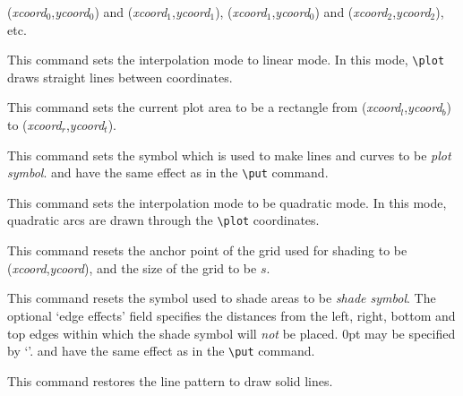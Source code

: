 \begin{syntax}
(\emph{xcoord}$_0$,\emph{ycoord}$_0$) and (\emph{xcoord}$_1$,\emph{ycoord}$_1$), (\emph{xcoord}$_1$,\emph{ycoord}$_0$)
and (\emph{xcoord}$_2$,\emph{ycoord}$_2$), etc.
\item[\tt\bsl setlinear]
This command sets the interpolation mode to linear mode. In this mode,
\verb+\plot+ draws straight lines between coordinates.
\item[\tt\bsl setplotarea x from \emph{xcoord}$_l$ to \emph{xcoord}$_r$, y from \emph{ycoord}$_b$
to \emph{ycoord}$_t$]
\begin{sloppypar}
This command sets the current plot area to be a rectangle from
(\emph{xcoord}$_l$,\emph{ycoord}$_b$) to (\emph{xcoord}$_r$,\emph{ycoord}$_t$).
\end{sloppypar}
\item[{\tt\bsl setplotsymbol (\{\emph{plot symbol}\}
{\rm[}[{\rm[}$o_x${\rm]}{\rm[}$o_y${\rm]}]{\rm]}
{\rm[}<\emph{xshift},\emph{yshift}>{\rm]})}]
This command sets the symbol which is used to make lines and curves to be
\emph{plot symbol}.
 and \type{[{\rm[}$o_x${\rm]}{\rm[}$o_y${\rm]}]}
have the same effect as in the \verb+\put+ command.
\item[\tt\bsl setquadratic]
This command sets the interpolation mode to be quadratic mode. In this mode,
quadratic arcs are drawn through the \verb+\plot+ coordinates.
\item[{\tt\bsl setshadegrid {\rm[}span <$s$>{\rm]} {\rm[}point at \emph{xcoord}
\emph{ycoord}{\rm]}}]
This command resets the anchor point of the grid used for shading to be
(\emph{xcoord},\emph{ycoord}), and the size of the grid to be $s$.
\item[{\tt\bsl setshadesymbol
{\rm[}<$\epsilon_{l}$,$\epsilon_{r}$,$\epsilon_{d}$,$\epsilon_{u}$>{\rm]}
(\{\emph{shade symbol}\}
{\rm[}[{\rm[}$o_x${\rm]}{\rm[}$o_y${\rm]}]{\rm]}
{\rm[}<\emph{xshift},\emph{yshift}>{\rm]})}]
This command resets the symbol used to shade areas to be \emph{shade symbol}.
The optional `edge effects' field 
specifies the distances from the left, right, bottom and top edges within
which the shade symbol will \emph{not} be placed. 0pt may be specified by
`'.
 and \type{[{\rm[}$o_x${\rm]}{\rm[}$o_y${\rm]}]}
have the same effect as in the \verb+\put+ command.
\item[\tt\bsl setsolid]
This command restores the line pattern to draw solid lines.
\item[\tt\bsl shaderectanglesoff]

\end{syntax}
